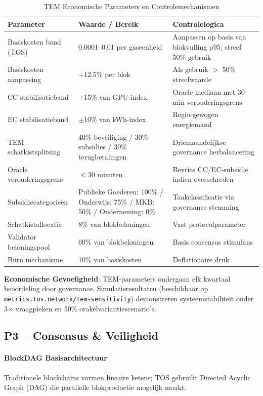 \documentclass[11pt]{article}
\begin{document}
\begin{table}[H]
\centering
\caption{TEM Economische Parameters en Controlemechanismen}
\label{tab:tem-parameters}
\begin{tabular}{@{}p{}p{}p{}@{}}
\toprule
\textbf{Parameter} & \textbf{Waarde / Bereik} & \textbf{Controlelogica} \\ \midrule
Basiskosten band (TOS) & 0.0001--0.01 per gaseenheid & Aanpassen op basis van blokvulling p95; streef 50\% gebruik \\
Basiskosten aanpassing & +12.5\% per blok & Als gebruik $>$ 50\% streefwaarde \\
CC stabilisatieband & $\pm$15\% van GPU-index & Oracle mediaan met 30-min verouderingsgrens \\
EC stabilisatieband & $\pm$10\% van kWh-index & Regio-gewogen energiemand \\
TEM schatkistsplitsing & 40\% beveiliging / 30\% subsidies / 30\% terugbetalingen & Driemaandelijkse governance herbalancering \\
Oracle verouderingsgrens & $\le$30 minuten & Bevries CC/EC-subsidie indien overschreden \\
Subsidiecategorieën & Publieke Goederen: 100\% / Onderwijs: 75\% / MKB: 50\% / Onderneming: 0\% & Taakclassificatie via governance stemming \\
Schatkistallocatie & 8\% van blokbeloningen & Vast protocolparameter \\
Validator beloningspool & 60\% van blokbeloningen & Basis consensus stimulans \\
Burn mechanisme & 10\% van basiskosten & Deflationaire druk \\
\bottomrule
\end{tabular}
\end{table}

\textbf{Economische Gevoeligheid}: TEM-parameters ondergaan elk kwartaal beoordeling door governance. Simulatieresultaten (beschikbaar op \texttt{metrics.tos.network/tem-sensitivity}) demonstreren systeemstabiliteit onder 3$\times$ vraagpieken en 50\% orakelvariantiescenario's.

\subsection{P3 -- Consensus \& Veiligheid}
\label{sec:pillar-consensus}

\paragraph{BlockDAG Basisarchitectuur}
Traditionele blockchains vormen lineaire ketens; TOS gebruikt Directed Acyclic Graph (DAG) die parallelle blokproductie mogelijk maakt.
\end{document}
